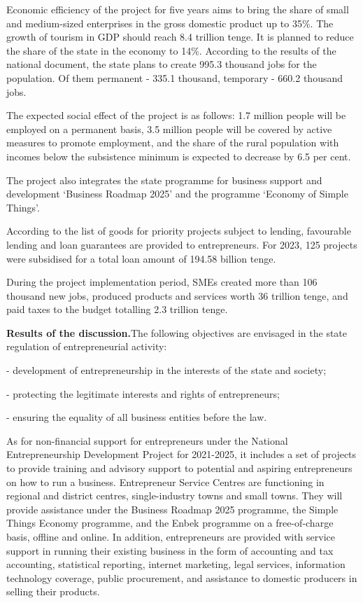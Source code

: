 \begin{multicols}{2}
Economic efficiency of the project for five years aims to bring the
share of small and medium-sized enterprises in the gross domestic
product up to 35\%. The growth of tourism in GDP should reach 8.4
trillion tenge. It is planned to reduce the share of the state in the
economy to 14\%. According to the results of the national document, the
state plans to create 995.3 thousand jobs for the population. Of them
permanent - 335.1 thousand, temporary - 660.2 thousand jobs.

The expected social effect of the project is as follows: 1.7 million
people will be employed on a permanent basis, 3.5 million people will be
covered by active measures to promote employment, and the share of the
rural population with incomes below the subsistence minimum is expected
to decrease by 6.5 per cent.

The project also integrates the state programme for business support and
development `Business Roadmap 2025' and the programme `Economy of Simple
Things'.

According to the list of goods for priority projects subject to lending,
favourable lending and loan guarantees are provided to entrepreneurs.
For 2023, 125 projects were subsidised for a total loan amount of 194.58
billion tenge.

During the project implementation period, SMEs created more than 106
thousand new jobs, produced products and services worth 36 trillion
tenge, and paid taxes to the budget totalling 2.3 trillion tenge.

{\bfseries Results of the discussion.}The following objectives are
envisaged in the state regulation of entrepreneurial activity:

- development of entrepreneurship in the interests of the state and
society;

- protecting the legitimate interests and rights of entrepreneurs;

- ensuring the equality of all business entities before the law.

As for non-financial support for entrepreneurs under the National
Entrepreneurship Development Project for 2021-2025, it includes a set of
projects to provide training and advisory support to potential and
aspiring entrepreneurs on how to run a business. Entrepreneur Service
Centres are functioning in regional and district centres,
single-industry towns and small towns. They will provide assistance
under the Business Roadmap 2025 programme, the Simple Things Economy
programme, and the Enbek programme on a free-of-charge basis, offline
and online. In addition, entrepreneurs are provided with service support
in running their existing business in the form of accounting and tax
accounting, statistical reporting, internet marketing, legal services,
information technology coverage, public procurement, and assistance to
domestic producers in selling their products.


\end{multicols}

